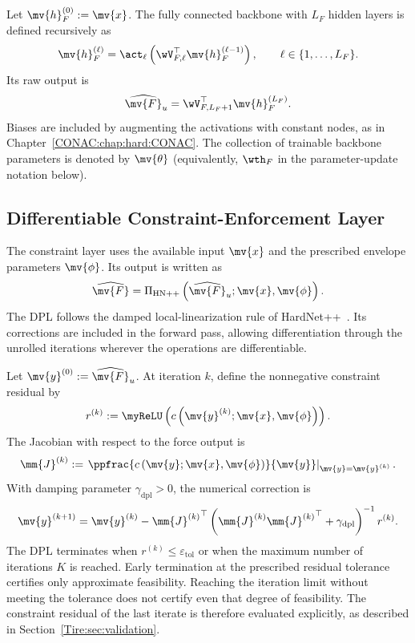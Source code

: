 Let $\mv{h}_F^{(0)}:=\mv{x}$. The fully connected backbone with $L_F$ hidden
layers is defined recursively as
\begin{equation}
	\label{Tire:eq:backbone:hidden}
	\mv{h}_F^{(\ell)}
	=
	\act_{\ell}
	\left(
	\wV_{F,\ell}^{\top}
	\mv{h}_F^{(\ell-1)}
	\right)
	,
	\qquad
	\ell\in\{1,\ldots,L_F\}
	.
\end{equation}
Its raw output is
\begin{equation}
	\label{Tire:eq:backbone:output}
	\widehat{\mv{F}}_u
	=
	\wV_{F,L_F+1}^{\top}
	\mv{h}_F^{(L_F)}
	.
\end{equation}
Biases are included by augmenting the activations with constant nodes,
as in Chapter~\ref{CONAC:chap:hard:CONAC}. The collection of trainable
backbone parameters is denoted by $\mv{\theta}$ (equivalently,
$\wth_F$ in the parameter-update notation below).

\subsection{Differentiable Constraint-Enforcement Layer}
\label{Tire:sec:dpl}

The constraint layer uses the available input $\mv{x}$ and the prescribed
envelope parameters $\mv{\phi}$. Its output is written as
\begin{equation}
	\label{Tire:eq:hardnet:tire:output}
	\widehat{\mv{F}}
	=
	\Pi_{\mathrm{HN++}}
	\left(
	\widehat{\mv{F}}_u;\mv{x},\mv{\phi}
	\right)
	.
\end{equation}
The DPL follows the damped local-linearization rule of
HardNet++~\cite{Goertzen:2026aa}. Its corrections are included in
the forward pass, allowing differentiation through the unrolled
iterations wherever the operations are differentiable.

Let $\mv{y}^{(0)}:=\widehat{\mv{F}}_u$. At iteration $k$, define the
nonnegative constraint residual by
\begin{equation}
	\label{Tire:eq:dpl:residual}
	r^{(k)}
	:=
	\myReLU
	\left(
	c
	\left(
		\mv{y}^{(k)};\mv{x},\mv{\phi}
		\right)
	\right)
	.
\end{equation}
The Jacobian with respect to the force output is
\begin{equation}
	\label{Tire:eq:dpl:jacobian}
	\mm{J}^{(k)}
	:=
	\left.
	\ppfrac{
		c\left(\mv{y};\mv{x},\mv{\phi}\right)
	}{\mv{y}}
	\right|_{\mv{y}=\mv{y}^{(k)}}
	.
\end{equation}
With damping parameter $\gamma_{\mathrm{dpl}}>0$, the numerical
correction is
\begin{equation}
	\label{Tire:eq:dpl:update}
	\mv{y}^{(k+1)}
	=
	\mv{y}^{(k)}
	-
	{\mm{J}^{(k)}}^{\top}
	\left(
	\mm{J}^{(k)}{\mm{J}^{(k)}}^{\top}
	+
	\gamma_{\mathrm{dpl}}
	\right)^{-1}
	r^{(k)}
	.
\end{equation}
The DPL terminates when $r^{(k)}\leq\varepsilon_{\mathrm{tol}}$
or when the maximum number of iterations $K$ is reached. Early
termination at the prescribed residual tolerance certifies only
approximate feasibility. Reaching the iteration limit without meeting
the tolerance does not certify even that degree of feasibility.
The constraint residual of the last iterate is therefore evaluated
explicitly, as described in Section~\ref{Tire:sec:validation}.


